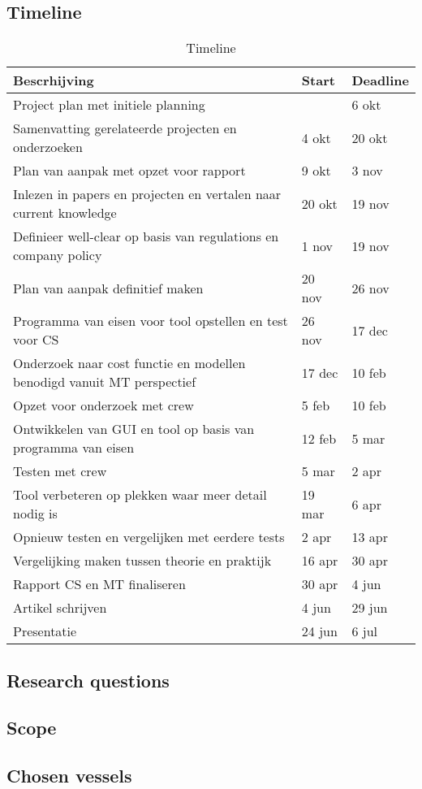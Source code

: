 \subsection{Timeline}
\begin{table}[h]
	\centering
	\caption{Timeline}
	\label{tab:timeline-project}
	\begin{tabular}{l||l|l}
		Bescrhijving & Start & Deadline \\ \hline \hline
		Project plan met initiele planning &  & 6 okt \\ \hline
		Samenvatting gerelateerde projecten en onderzoeken & 4 okt & 20 okt \\ \hline
		Plan van aanpak met opzet voor rapport & 9 okt & 3 nov \\ \hline
		Inlezen in papers en projecten en vertalen naar current knowledge & 20 okt & 19 nov \\ \hline
		Definieer well-clear op basis van regulations en company policy & 1 nov & 19 nov \\ \hline
		Plan van aanpak definitief maken & 20 nov & 26 nov \\ \hline
		Programma van eisen voor tool opstellen en test voor CS & 26 nov & 17 dec \\ \hline
		Onderzoek naar cost functie en modellen benodigd vanuit MT perspectief & 17 dec & 10 feb \\ \hline
		Opzet voor onderzoek met crew & 5 feb & 10 feb \\ \hline
		Ontwikkelen van GUI en tool op basis van programma van eisen & 12 feb & 5 mar \\ \hline
		Testen met crew & 5 mar & 2 apr \\ \hline
		Tool verbeteren op plekken waar meer detail nodig is & 19 mar & 6 apr \\ \hline
		Opnieuw testen en vergelijken met eerdere tests & 2 apr & 13 apr \\ \hline
		Vergelijking maken tussen theorie en praktijk & 16 apr & 30 apr \\ \hline
		Rapport CS en MT finaliseren & 30 apr & 4 jun \\ \hline
		Artikel schrijven & 4 jun & 29 jun \\ \hline
		Presentatie & 24 jun & 6 jul
	\end{tabular}
\end{table}

\subsection{Research questions}

\subsection{Scope}

\subsection{Chosen vessels}
